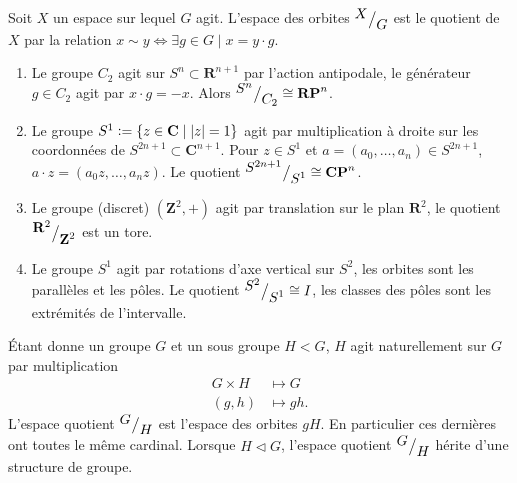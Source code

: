 \documentclass[main.tex]{subfiles}
\begin{document}
	\begin{definition}
		Soit $X$ un espace sur lequel $G$ agit. L'espace des orbites ${^{\textstyle X}\big/_{\textstyle G}}$ est le quotient de $X$ par la relation $x \sim y \iff \exists g \in G \;|\; x = y \cdot g$.
	\end{definition}
	\begin{example}
		\begin{enumerate}
			\item Le groupe $C_2$ agit  sur  $S^n \subset \mathbf{R}^{n+1}$ par l'action antipodale, le générateur $g\in C_2$ agit par $x\cdot g = -x$. Alors ${^{\textstyle S^n}\big/_{\textstyle C_2}} \cong \mathbf{RP}^n$. 
			\item Le groupe $S^1 \vcentcolon= \{z\in \mathbf{C} \;|\; |z| = 1\}$ agit par multiplication  à droite sur les coordonnées de $S^{2n+1} \subset \mathbf{C}^{n+1}$. Pour $z\in S^1$ et $a=(a_0,\ldots,a_n) \in S^{2n+1}$, $a\cdot z = (a_0z,\ldots,a_nz)$. Le quotient ${^{\textstyle S^{2n+1}}\big/_{\textstyle S^1}} \cong \mathbf{CP}^n$. 
			\item Le groupe (discret) $(\mathbf{Z}^2,+)$ agit par translation sur le plan $\mathbf{R}^2$, le quotient ${^{\textstyle \mathbf{R}^2}\big/_{\textstyle \mathbf{Z}^2}}$ est un tore.
			\item Le groupe $S^1$ agit par rotations d'axe vertical sur $S^2$, les orbites sont les parallèles et les pôles. Le quotient ${^{\textstyle S^2}\big/_{\textstyle S^1}} \cong I$, les classes des pôles sont les extrémités de l'intervalle.
		\end{enumerate}	
	\end{example}
	\begin{remark}
		Étant donne un groupe $G$ et un sous groupe $H < G$, $H$ agit naturellement sur $G$ par multiplication
		\begin{align*}
			G\times H &\longmapsto G\\
			(g,h) &\longmapsto gh
		.\end{align*}
		L'espace quotient ${^{\textstyle G}\big/_{\textstyle H}}$ est l'espace des orbites $gH$. En particulier ces dernières ont toutes le même cardinal. Lorsque $H \triangleleft G$, l'espace quotient ${^{\textstyle G}\big/_{\textstyle H}}$ hérite d'une structure de groupe.
	\end{remark}
\end{document}
